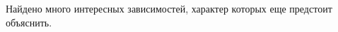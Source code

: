 \documentclass[specialist, substylefile = spbureport.rtx,
    subf,href,colorlinks=true, 12pt]{disser}
\begin{document}





        

        


    \conclusion
        Найдено много интересных зависимостей, характер которых еще предстоит объяснить.
 
\end{document}
